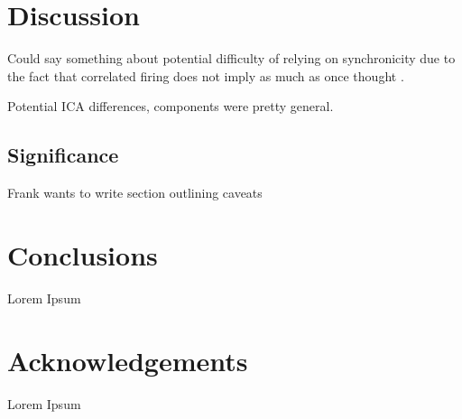 \documentclass[a4paper]{article}
\begin{document}
\section{Discussion}

Could say something about potential difficulty of relying on synchronicity due to the fact that correlated firing does not imply as much as once thought \cite{Moreno-Bote2014}.

Potential ICA differences, components were pretty general.

\subsection{Significance}

Frank wants to write section outlining caveats

\section{Conclusions}

Lorem Ipsum

\section{Acknowledgements}

Lorem Ipsum





\end{document}
